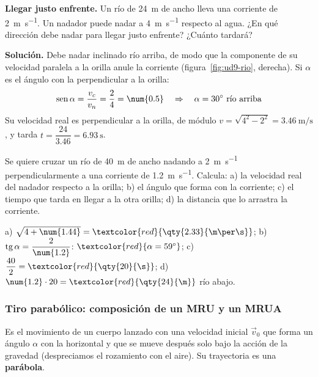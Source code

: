 \begin{example}
    \textbf{Llegar justo enfrente.} Un río de \qty{24}{\m} de ancho lleva una corriente de \qty{2}{\m\per\s}. Un nadador puede
    nadar a \qty{4}{\m\per\s} respecto al agua. ¿En qué dirección debe nadar para llegar justo enfrente? ¿Cuánto tardará?

    \textbf{Solución.} Debe nadar inclinado río arriba, de modo que la componente de su velocidad paralela a la orilla anule la
    corriente (figura~\ref{fig:ud9-rio}, derecha). Si \(\alpha\) es el ángulo con la perpendicular a la orilla:
    \[ \sen\alpha = \frac{v_c}{v_n} = \frac{2}{4} = \num{0.5} \quad\Rightarrow\quad \alpha = 30^\circ \text{ río arriba} \]
    Su velocidad real es perpendicular a la orilla, de módulo \(v = \sqrt{4^2 - 2^2} = \qty{3.46}{\m\per\s}\), y tarda
    \(t = \dfrac{24}{\num{3.46}} = \qty{6.93}{\s}\).
\end{example}

\begin{exercise}
    Se quiere cruzar un río de \qty{40}{\m} de ancho nadando a \qty{2}{\m\per\s} perpendicularmente a una corriente de
    \qty{1.2}{\m\per\s}. Calcula: a) la velocidad real del nadador respecto a la orilla; b) el ángulo que forma con la corriente;
    c) el tiempo que tarda en llegar a la otra orilla; d) la distancia que lo arrastra la corriente.
    \begin{solu}
        a) \(\sqrt{4 + \num{1.44}} = \textcolor{red}{\qty{2.33}{\m\per\s}}\); b) \(\tg\alpha = \dfrac{2}{\num{1.2}}\):
        \(\textcolor{red}{\alpha = 59^\circ}\); c) \(\dfrac{40}{2} = \textcolor{red}{\qty{20}{\s}}\); d) \(\num{1.2} \cdot 20 =
        \textcolor{red}{\qty{24}{\m}}\) río abajo.
    \end{solu}
\end{exercise}

\subsubsection{Tiro parabólico: composición de un MRU y un MRUA}

\begin{definition}
    Es el movimiento de un cuerpo lanzado con una velocidad inicial \(\vec v_0\) que forma un ángulo \(\alpha\) con la horizontal y que
    se mueve después solo bajo la acción de la gravedad (despreciamos el rozamiento con el aire). Su trayectoria es una
    \textbf{parábola}.
\end{definition}

